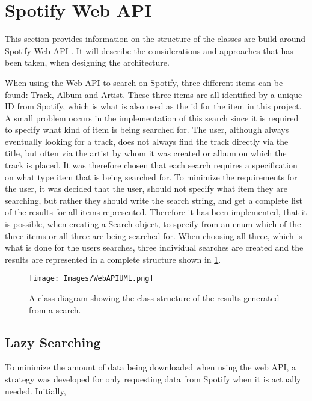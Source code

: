 \section{Spotify Web API}
\label{imp:spotify_web_api}
This section provides information on the structure of the classes are build around Spotify Web API . It will describe the considerations and approaches that has been taken, when designing the architecture.

When using the Web API to search on Spotify, three different items can be found: Track, Album and Artist. These three items are all identified by a unique ID from Spotify, which is what is also used as the id for the item in this project. A small problem occurs in the implementation of this search since it is required to specify what kind of item is being searched for. The user, although always eventually looking for a track, does not always find the track directly via the title, but often via the artist by whom it was created or album on which the track is placed. It was therefore chosen that each search requires a specification on what type item that is being searched for. To minimize the requirements for the user, it was decided that the user, should not specify what item they are searching, but rather they should write the search string, and get a complete list of the results for all items represented. Therefore it has been implemented, that it is possible, when creating a Search object, to specify from an enum which of the three items or all three are being searched for. When choosing all three, which is what is done for the users searches, three individual searches are created and the results are represented in a complete structure shown in \cref{fig:WebAPIUML}.

\begin{figure}[hbtp]
\centering
\texttt{[image: Images/WebAPIUML.png]}
\caption[Class structure of the results generated from a search.]{A class diagram showing the class structure of the results generated from a search.}
\label{fig:WebAPIUML}
\end{figure}

\subsection{Lazy Searching}

To minimize the amount of data being downloaded when using the web API, a strategy was developed for only requesting data from Spotify when it is actually needed. Initially, 

